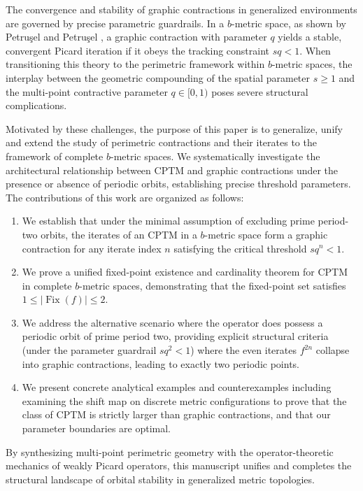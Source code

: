 \documentclass[a4paper,12pt,oneside]{article}
\numberwithin{equation}{section}
\begin{document}
The convergence and stability of graphic contractions in generalized environments are governed by precise parametric guardrails. In a $b$-metric space, as shown by Petruşel and Petruşel \cite{petrusel2023}, a graphic contraction with parameter $q$ yields a stable, convergent Picard iteration if it obeys the tracking constraint $sq< 1$. When transitioning this theory to the perimetric framework within $b$-metric spaces, the interplay between the geometric compounding of the spatial parameter $s\geq 1$ and the multi-point contractive parameter $q\in [0,1)$ poses severe structural complications.

Motivated by these challenges, the purpose of this paper is to generalize, unify and extend the study of perimetric contractions and their iterates to the framework of complete $b$-metric spaces. We systematically investigate the architectural relationship between CPTM and graphic contractions under the presence or absence of periodic orbits, establishing precise threshold parameters. The contributions of this work are organized as follows:
\begin{enumerate}
\item We establish that under the minimal assumption of excluding prime period-two orbits, the iterates of an CPTM in a $b$-metric space form a graphic contraction for any iterate index $n$ satisfying the critical threshold $sq^n < 1$.
\item We prove a unified fixed-point existence and cardinality theorem for CPTM in complete $b$-metric spaces, demonstrating that the fixed-point set satisfies $1 \leq |\operatorname{Fix}(f)| \leq 2$.
\item We address the alternative scenario where the operator does possess a periodic orbit of prime period two, providing explicit structural criteria (under the parameter guardrail $sq^2 < 1$) where the even iterates $f^{2n}$ collapse into graphic contractions, leading to exactly two periodic points.
\item We present concrete analytical examples and counterexamples including examining the shift map on discrete metric configurations to prove that the class of CPTM is strictly larger than graphic contractions, and that our parameter boundaries are optimal.
\end{enumerate}
By synthesizing multi-point perimetric geometry with the operator-theoretic mechanics of weakly Picard operators, this manuscript unifies and completes the structural landscape of orbital stability in generalized metric topologies.
\end{document}
